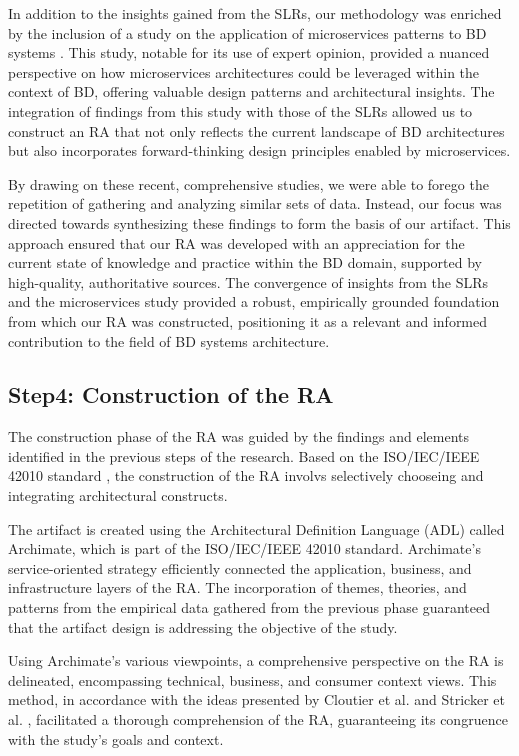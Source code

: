 \documentclass[journal]{IEEEtran}
\begin{document}
In addition to the insights gained from the SLRs, our methodology was enriched by the inclusion of a study on the application of microservices patterns to BD systems \cite{ataei2023application}. This study, notable for its use of expert opinion, provided a nuanced perspective on how microservices architectures could be leveraged within the context of BD, offering valuable design patterns and architectural insights. The integration of findings from this study with those of the SLRs allowed us to construct an RA that not only reflects the current landscape of BD architectures but also incorporates forward-thinking design principles enabled by microservices.

By drawing on these recent, comprehensive studies, we were able to forego the repetition of gathering and analyzing similar sets of data. Instead, our focus was directed towards synthesizing these findings to form the basis of our artifact. This approach ensured that our RA was developed with an appreciation for the current state of knowledge and practice within the BD domain, supported by high-quality, authoritative sources. The convergence of insights from the SLRs and the microservices study provided a robust, empirically grounded foundation from which our RA was constructed, positioning it as a relevant and informed contribution to the field of BD systems architecture.


\subsection{Step4: Construction of the RA}
The construction phase of the RA was guided by the findings and elements identified in the previous steps of the research. Based on the ISO/IEC/IEEE 42010 standard \cite{ISO42010}, the construction of the RA involvs selectively chooseing and integrating architectural constructs.

The artifact is created using the Architectural Definition Language (ADL) called Archimate, which is part of the ISO/IEC/IEEE 42010 standard. Archimate's service-oriented strategy efficiently connected the application, business, and infrastructure layers of the RA. The incorporation of themes, theories, and patterns from the empirical data gathered from the previous phase guaranteed that the artifact design is addressing the objective of the study.

Using Archimate's various viewpoints, a comprehensive perspective on the RA is delineated, encompassing technical, business, and consumer context views. This method, in accordance with the ideas presented by Cloutier et al. \cite{Cloutier2010} and Stricker et al. \cite{stricker2010creating}, facilitated a thorough comprehension of the RA, guaranteeing its congruence with the study's goals and context.
\end{document}
